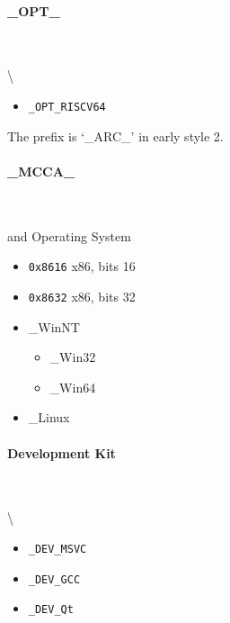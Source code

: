 \paragraph{\_OPT\_} \

 \textbackslash{}

\begin{itemize}

\item \verb|_OPT_RISCV64|
\end{itemize}

The prefix is `\_ARC\_' in early style 2.



\paragraph{\_MCCA\_} \

 and Operating System

\begin{itemize}

\item \verb|0x8616| x86, bits 16
\item \verb|0x8632| x86, bits 32
\item \_WinNT

\begin{itemize}

\item \_Win32
\item \_Win64
\end{itemize}



\item \_Linux
\end{itemize}



\paragraph{Development Kit} \

 \textbackslash{}

\begin{itemize}

\item \verb|_DEV_MSVC|
\item \verb|_DEV_GCC|
\item \verb|_DEV_Qt|
\end{itemize}

